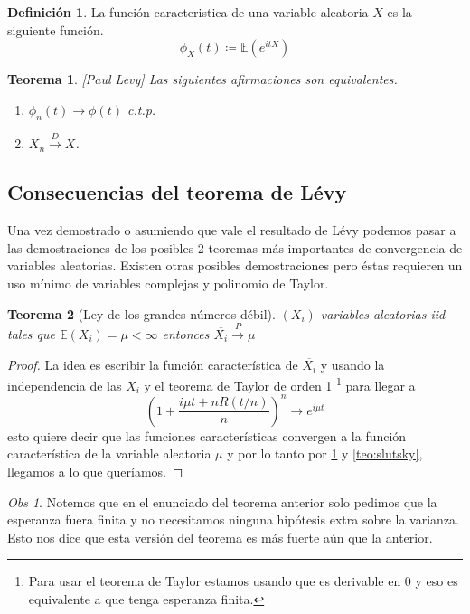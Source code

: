 \documentclass[11pt]{article}
\theoremstyle{plain} %
\newtheorem{teorema}{\color{rojo}Teorema}
\theoremstyle{definition}
\newtheorem*{definicion}{Definici\'{o}n} %
\theoremstyle{remark}
\newtheorem{obs}{Obs}
\def\E{\mathbb{E}}
\def\va{variable aleatoria }
\def\vas{variables aleatorias }
\def\blue{\textcolor{blue!60!black}}
\newcommand{\proba}{\overset{P}{\to}}
\newcommand{\dist}{\overset{D}{\to}}
\begin{document}
\begin{definicion}
	La \blue{función caracteristica} de una \va $X$ es la siguiente función. 
	\[ \phi_{X}(t) \coloneqq \E(e^{itX}) \]
\end{definicion}

\begin{teorema}
	\label{teo:levy}
	[Paul Levy]
	Las siguientes afirmaciones son equivalentes.
	\begin{enumerate}
		\item $\phi_{n}(t) \to \phi(t)$ c.t.p.
		\item $X_n \dist X$.
	\end{enumerate}
\end{teorema}


\subsection{Consecuencias del teorema de Lévy}

Una vez demostrado o asumiendo que vale el resultado de Lévy podemos pasar a las demostraciones de los posibles 2 teoremas más importantes de convergencia de variables aleatorias. Existen otras posibles demostraciones pero éstas requieren un uso mínimo de variables complejas y polinomio de Taylor.

\begin{teorema}
	[Ley de los grandes números débil]
	$(X_i) $ \vas iid tales que $\E(X_i) = \mu < \infty$ entonces $\overline{X_i} \proba \mu$
\end{teorema}

\begin{proof}
	La idea es escribir la función característica de $\overline{X_i}$ y usando la independencia de las $X_i$ y el teorema de Taylor de orden 1 \footnote{Para usar el teorema de Taylor estamos usando que es derivable en 0 y eso es equivalente a que tenga esperanza finita.} para llegar a 
	\[ \left( 1+ \dfrac{i\mu t + nR(t/n)}{n} \right) ^ {n} \to e^{i\mu t}  \]
	esto quiere decir que las funciones características convergen a la función característica de la variable aleatoria $\mu$ y por lo tanto por \ref{teo:levy} y \ref{teo:slutsky}, llegamos a lo que queríamos.  
\end{proof}

\begin{obs}
	Notemos que en el enunciado del teorema anterior solo pedimos que la esperanza fuera finita y no necesitamos ninguna hipótesis extra sobre la varianza. Esto nos dice que esta versión del teorema es más fuerte aún que la anterior.
\end{obs}
\end{document}
